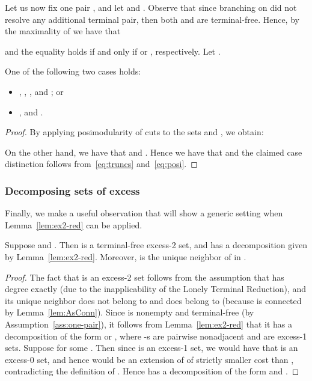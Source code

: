 \newcommand{\Atr}{\tilde{A}}
\newcommand{\Btr}{\tilde{B}}

Let us now fix one pair , and let  and . Observe that since branching on  did not resolve any additional terminal pair, then both  and  are terminal-free. Hence, by the maximality of  we have that

and the equality holds if and only if  or , respectively. Let .

\begin{lemma}\label{lem:posi}
One of the following two cases holds:
\begin{itemize}
\item , , , and ; or
\item , and .
\end{itemize}
\end{lemma}
\begin{proof}
By applying posimodularity of cuts to the sets  and , we obtain:

On the other hand, we have that  and . Hence we have that  and the claimed case distinction follows from~\eqref{eq:truncs} and~\eqref{eq:posi}.
\end{proof}

\subsubsection{Decomposing sets of excess }

Finally, we make a useful observation that will show a generic setting when Lemma~\ref{lem:ex2-red} can be applied.

\begin{lemma}\label{lem:cool}
Suppose  and . Then  is a terminal-free excess-2 set, and  has a decomposition  given by Lemma~\ref{lem:ex2-red}.
Moreover,  is the unique neighbor of  in .
\end{lemma}
\begin{proof}
The fact that  is an excess-2 set follows from the assumption that  has degree exactly  (due to the inapplicability of the Lonely Terminal Reduction), and its unique neighbor  does not belong to 
and does belong to  (because  is connected by Lemma~\ref{lem:AsConn}).
Since  is nonempty and terminal-free (by Assumption~\ref{ass:one-pair}),
it follows from Lemma~\ref{lem:ex2-red} that it has a decomposition of the form  or , where -s are pairwise nonadjacent and  are excess-1 sets. Suppose  for some . Then since  is an excess-1 set, we would have that  is an excess-0 set, and hence  would be an extension of  of strictly smaller cost than , contradicting the definition of . Hence  has a decomposition of the form  and .
\end{proof}

